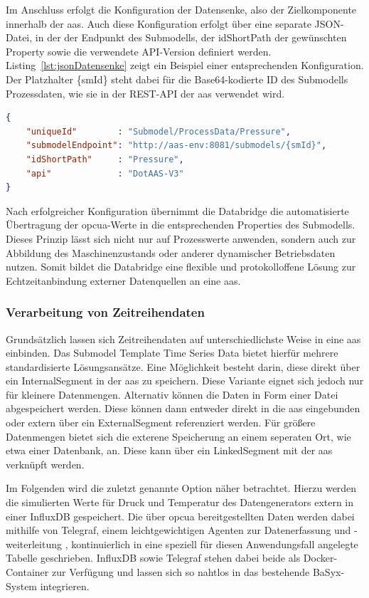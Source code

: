 Im Anschluss erfolgt die Konfiguration der Datensenke, also der Zielkomponente innerhalb der \acs{aas}.
Auch diese Konfiguration erfolgt über eine separate JSON-Datei, in der der Endpunkt des Submodells, der idShortPath der gewünschten Property sowie die verwendete API-Version definiert werden.
Listing~\ref{lst:jsonDatensenke} zeigt ein Beispiel einer entsprechenden Konfiguration.
Der Platzhalter \{smId\} steht dabei für die Base64-kodierte ID des Submodells Prozessdaten, wie sie in der REST-API der \acs{aas} verwendet wird.
\begin{lstlisting}[language=json, caption={Beispielhafte JSON-Konfiguration einer Datensenke}, label={lst:jsonDatensenke}]
{
    "uniqueId"        : "Submodel/ProcessData/Pressure",
    "submodelEndpoint": "http://aas-env:8081/submodels/{smId}",
    "idShortPath"     : "Pressure",
    "api"             : "DotAAS-V3"
}
\end{lstlisting}

Nach erfolgreicher Konfiguration übernimmt die Databridge die automatisierte Übertragung der \acs{opcua}-Werte in die entsprechenden Properties des Submodells.
Dieses Prinzip lässt sich nicht nur auf Prozesswerte anwenden, sondern auch zur Abbildung des Maschinenzustands oder anderer dynamischer Betriebsdaten nutzen.
Somit bildet die Databridge eine flexible und protokolloffene Lösung zur Echtzeitanbindung externer Datenquellen an eine \acs{aas}.


\subsubsection{Verarbeitung von Zeitreihendaten}

Grundsätzlich lassen sich Zeitreihendaten auf unterschiedlichste Weise in eine \acs{aas} einbinden.
Das Submodel Template Time Series Data \cite{SpezifikationTimeSeriesData} bietet hierfür mehrere standardisierte Lösungsansätze.
Eine Möglichkeit besteht darin, diese direkt über ein InternalSegment in der \acs{aas} zu speichern.
Diese Variante eignet sich jedoch nur für kleinere Datenmengen.
Alternativ können die Daten in Form einer Datei abgespeichert werden.
Diese können dann entweder direkt in die \acs{aas} eingebunden oder extern über ein ExternalSegment referenziert werden.
Für größere Datenmengen bietet sich die exterene Speicherung an einem seperaten Ort, wie etwa einer Datenbank, an.
Diese kann über ein LinkedSegment mit der \acs{aas} verknüpft werden.

Im Folgenden wird die zuletzt genannte Option näher betrachtet.
Hierzu werden die simulierten Werte für Druck und Temperatur des Datengenerators extern in einer InfluxDB gespeichert.
Die über \acs{opcua} bereitgestellten Daten werden dabei mithilfe von Telegraf, einem leichtgewichtigen Agenten zur Datenerfassung und -weiterleitung \cite{Influx}, kontinuierlich in eine speziell für diesen Anwendungsfall angelegte Tabelle geschrieben.
InfluxDB sowie Telegraf stehen dabei beide als Docker-Container zur Verfügung und lassen sich so nahtlos in das bestehende BaSyx-System integrieren.

